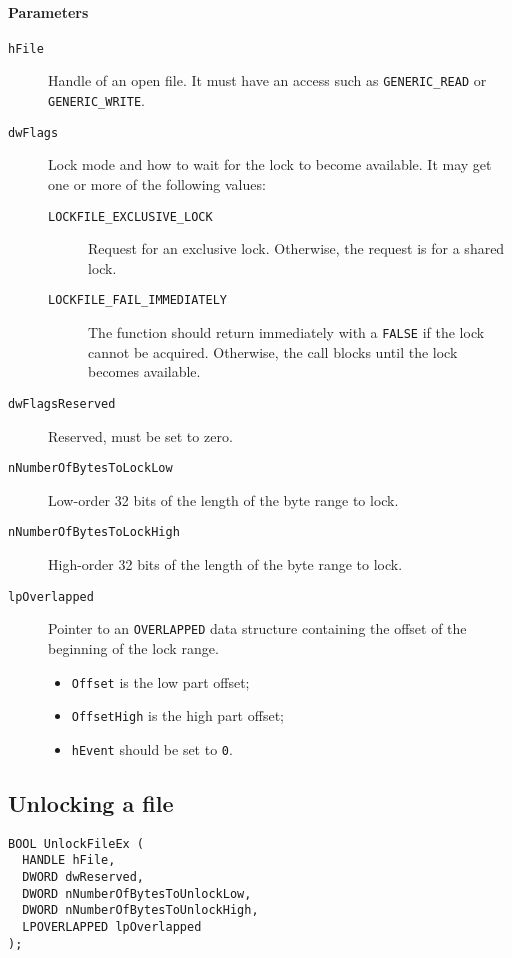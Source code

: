 \paragraph{Parameters}
\begin{description}
\item [\texttt{hFile}] Handle of an open file. It must have an access such as \texttt{GENERIC\_READ} or \texttt{GENERIC\_WRITE}.
\item [\texttt{dwFlags}] Lock mode and how to wait for the lock to become available. It may get one or more of the following values:
\begin{description}
\item [\texttt{LOCKFILE\_EXCLUSIVE\_LOCK}] Request for an exclusive lock. Otherwise, the request is for a shared lock.
\item [\texttt{LOCKFILE\_FAIL\_IMMEDIATELY}] The function should return immediately with a \texttt{FALSE} if the lock cannot be acquired. Otherwise, the call blocks until the lock becomes available.
\end{description}
\item [\texttt{dwFlagsReserved}] Reserved, must be set to zero.
\item [\texttt{nNumberOfBytesToLockLow}] Low-order 32 bits of the length of the byte range to lock.
\item [\texttt{nNumberOfBytesToLockHigh}] High-order 32 bits of the length of the byte range to lock.
\item [\texttt{lpOverlapped}] Pointer to an \texttt{OVERLAPPED} data structure containing the offset of the beginning of the lock range.
\begin{itemize}
\item \texttt{Offset} is the low part offset;
\item \texttt{OffsetHigh} is the high part offset;
\item \texttt{hEvent} should be set to \texttt{0}.
\end{itemize}
\end{description}

\subsection{Unlocking a file}
\begin{verbatim}
BOOL UnlockFileEx (
  HANDLE hFile,
  DWORD dwReserved,
  DWORD nNumberOfBytesToUnlockLow,
  DWORD nNumberOfBytesToUnlockHigh,
  LPOVERLAPPED lpOverlapped
);
\end{verbatim}

